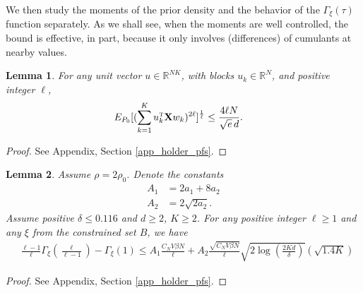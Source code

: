 \documentclass{article}
\numberwithin{equation}{section}
\theoremstyle{Lemma}
\newtheorem{lemma}{Lemma}
\theoremstyle{Corollary}
\theoremstyle{Theorem}
\theoremstyle{Remark}
\begin{document}
We then study the moments of the prior density and the behavior of the $\Gamma_{\xi}(\tau)$ function separately. As we shall see, when the moments are well controlled, the bound is effective, in part, because it only involves (differences) of cumulants at nearby values.
\begin{lemma}\label{prior_moments_lemma}
    For any unit vector $u \in \mathbb{R}^{NK}$, with blocks $u_{k} \in \mathbb{R}^{N}$, and positive integer $\ell$,
    \begin{align}
        E_{P_{0}}[(\sum_{k=1}^{K}u_{k}^{\text{\tiny{T}}}\textbf{X} w_{k})^{2\ell}]^{\frac{1}{\ell}}&\leq \frac{4\ell N}{\sqrt{e}\,d}.
    \end{align}
\end{lemma}
\begin{proof}
    See Appendix, Section \ref{app_holder_pfs}.
\end{proof}

\begin{lemma}\label{CGF_Growth}
Assume $\rho= 2\rho_0$. Denote the constants
\begin{align}
    A_{1}&=2a_{1}+8a_{2}\label{A_1_def}\\
    A_{2}&=2 \sqrt{2a_{2}}.\label{A_2_def}
\end{align}
Assume positive $\delta \leq  0.116$ and  $d \geq 2$, $K \geq 2$. For any positive integer $\ell \geq 1$ and any $\xi$ from the constrained set $B$, we have
\begin{align}
    &\frac{\ell-1}{\ell}\Gamma_{\xi}(\frac{\ell}{\ell-1}) - \Gamma_{\xi}(1)\leq A_{1}\frac{C_{N}V\beta N}{\ell}+A_{2}\frac{\sqrt{C_{N}V\beta N}}{\ell} \sqrt{2 \log(\frac{2Kd}{\delta})}(\sqrt{1.4K})
\end{align}
\end{lemma}
\begin{proof}
    See Appendix, Section \ref{app_holder_pfs}.
\end{proof}
\end{document}
